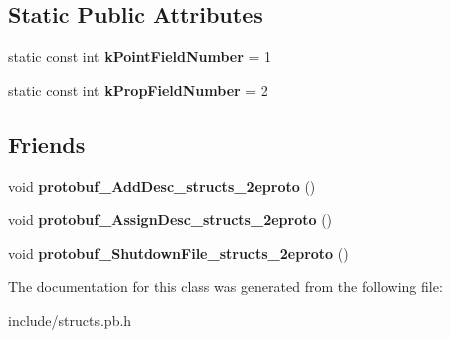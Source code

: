 \subsection*{Static Public Attributes}
\begin{DoxyCompactItemize}
\item 
\hypertarget{classstruct_definitions_1_1_vertex_a08671112cd10221e8c180feb539c36c3}{}\label{classstruct_definitions_1_1_vertex_a08671112cd10221e8c180feb539c36c3} 
static const int {\bfseries k\+Point\+Field\+Number} = 1
\item 
\hypertarget{classstruct_definitions_1_1_vertex_a8f9a9c5c4929540a24ccaf470df9d71c}{}\label{classstruct_definitions_1_1_vertex_a8f9a9c5c4929540a24ccaf470df9d71c} 
static const int {\bfseries k\+Prop\+Field\+Number} = 2
\end{DoxyCompactItemize}
\subsection*{Friends}
\begin{DoxyCompactItemize}
\item 
\hypertarget{classstruct_definitions_1_1_vertex_abcf9b7cc173b6d79696d01156751b8ce}{}\label{classstruct_definitions_1_1_vertex_abcf9b7cc173b6d79696d01156751b8ce} 
void {\bfseries protobuf\+\_\+\+Add\+Desc\+\_\+structs\+\_\+2eproto} ()
\item 
\hypertarget{classstruct_definitions_1_1_vertex_adb32752ff5178cb902966da6e3cb3bc6}{}\label{classstruct_definitions_1_1_vertex_adb32752ff5178cb902966da6e3cb3bc6} 
void {\bfseries protobuf\+\_\+\+Assign\+Desc\+\_\+structs\+\_\+2eproto} ()
\item 
\hypertarget{classstruct_definitions_1_1_vertex_ac2e4278d7604361fa6502b1cfbf9d980}{}\label{classstruct_definitions_1_1_vertex_ac2e4278d7604361fa6502b1cfbf9d980} 
void {\bfseries protobuf\+\_\+\+Shutdown\+File\+\_\+structs\+\_\+2eproto} ()
\end{DoxyCompactItemize}


The documentation for this class was generated from the following file\+:\begin{DoxyCompactItemize}
\item 
include/structs.\+pb.\+h\end{DoxyCompactItemize}
